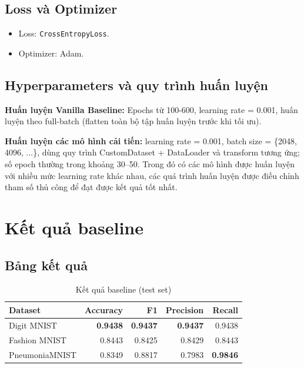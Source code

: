 \documentclass[a4paper,12pt]{report}
\begin{document}
\subsection{Loss và Optimizer}
\begin{itemize}
    \item Loss: \texttt{CrossEntropyLoss}.
    \item Optimizer: Adam.
\end{itemize}

\subsection{Hyperparameters và quy trình huấn luyện}

\textbf{Huấn luyện Vanilla Baseline:} Epochs từ 100-600, learning rate = 0.001, huấn luyện theo full-batch (flatten toàn bộ tập huấn
luyện trước khi tối ưu).

\noindent \textbf{Huấn luyện các mô hình cải tiến:} learning rate = 0.001, batch size = \{2048, 4096, ...\}, dùng quy trình CustomDataset + DataLoader và transform tương ứng; số epoch thường trong khoảng 30--50. Trong đó có các mô hình được huấn luyện với nhiều mức learning rate khác nhau, các quá trình huấn luyện được điều chỉnh tham số thủ công để đạt được kết quả tốt nhất.

\section{Kết quả baseline}
\subsection{Bảng kết quả}
\begin{table}[H]
    \centering
    \caption{Kết quả baseline (test set)}
    \label{tab:baseline-metrics}
    \begin{tabular}{lrrrr}
        \toprule
        \textbf{Dataset} & \textbf{Accuracy} & \textbf{F1} & \textbf{Precision} & \textbf{Recall} \\
        \midrule
        Digit MNIST & \textbf{0.9438} & \textbf{0.9437} & \textbf{0.9437} & 0.9438 \\
        Fashion MNIST & 0.8443 & 0.8425 & 0.8429 & 0.8443 \\
        PneumoniaMNIST & 0.8349 & 0.8817 & 0.7983 & \textbf{0.9846} \\
        \bottomrule
    \end{tabular}
\end{table}
\end{document}
